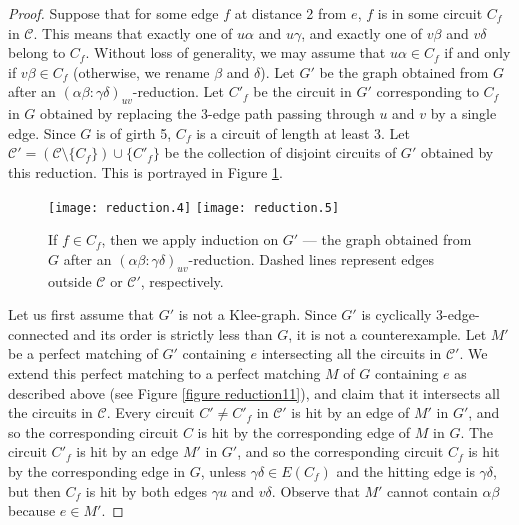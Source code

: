 \documentclass[]{theclass}
\begin{document}
\begin{proof}
Suppose that for some edge $f$ at distance 2 from $e$, $f$ is in some circuit $C_f$ in $\mathcal{C}$. This means that exactly one of $u\alpha$ and $u\gamma$, and exactly one of $v\beta$ and $v\delta$ belong to $C_f$. Without loss of generality, we may assume that $u\alpha\in C_f$ if and only if $v\beta \in C_f$  (otherwise, we rename $\beta$ and $\delta$). Let $G'$ be the graph obtained from $G$ after an $(\alpha\beta:\gamma\delta)_{uv}$-reduction. 
Let $C'_f$ be the circuit in $G'$ corresponding to $C_f$ in $G$ obtained by replacing the 3-edge path passing through $u$ and $v$ by a single edge. Since $G$ is of girth 5, $C_f$ is a circuit of length at least 3.
Let $\mathcal{C}' = (\mathcal{C}\setminus\{C_f\})\cup\{C'_f\}$ be the collection of disjoint circuits of $G'$ obtained by this reduction. This is portrayed in Figure \ref{figure casei}.

\begin{figure}[ht]
      \centering
      \hfill
      \texttt{[image: reduction.4]}\hfill\hfill
      \texttt{[image: reduction.5]}\hfill{}
\caption{If $f\in C_f$, then we apply induction on $G'$ --- the graph obtained from $G$ after an $(\alpha\beta:\gamma\delta)_{uv}$-reduction. Dashed lines represent edges outside $\mathcal{C}$ or $\mathcal{C}'$, respectively.}
      \label{figure casei}
\end{figure}

Let us first assume that $G'$ is not a Klee-graph. Since $G'$ is cyclically 3-edge-connected and its order is strictly less than $G$, it is not a counterexample. Let $M'$ be a perfect matching of $G'$ containing $e$ intersecting all the circuits in $\mathcal{C}'$. We extend this perfect matching to a perfect matching $M$ of $G$ containing $e$ as described above (see Figure \ref{figure reduction11}), and claim that it intersects all the circuits in $\mathcal{C}$. Every circuit $C'\ne C'_f$ in $\mathcal{C'}$ is hit by an edge of $M'$ in $G'$, and so the corresponding circuit $C$ is hit by the corresponding edge of $M$ in $G$. The circuit $C'_f$ is hit by an edge $M'$ in $G'$, and so the corresponding circuit $C_f$ is hit by the corresponding edge in $G$, unless $\gamma\delta\in E(C_f)$ and the hitting edge is  $\gamma\delta$, but then $C_f$ is hit by both edges $\gamma u$ and $v\delta$. Observe that $M'$ cannot contain $\alpha\beta$ because $e\in M'$.


\end{proof}
\end{document}
